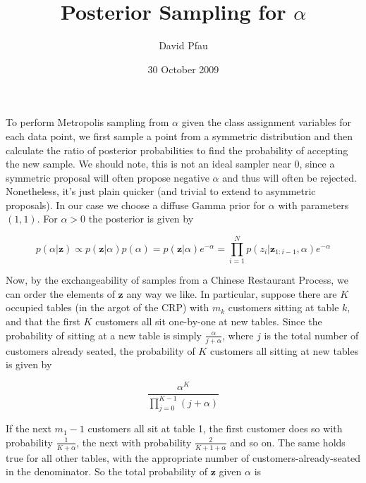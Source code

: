 \documentclass[11pt]{article}
\title{Posterior Sampling for $\alpha$}
\author{David Pfau}
\date{30 October 2009}                                           %
\begin{document}
\maketitle

To perform Metropolis sampling from $\alpha$ given the class assignment variables for each data point, we first sample a point from a symmetric distribution and then calculate the ratio of posterior probabilities to find the probability of accepting the new sample.  We should note, this is not an ideal sampler near $0$, since a symmetric proposal will often propose negative $\alpha$ and thus will often be rejected.  Nonetheless, it's just plain quicker (and trivial to extend to asymmetric proposals).  In our case we choose a diffuse Gamma prior for $\alpha$ with parameters $(1,1)$.  For $\alpha > 0$ the posterior is given by

\begin{equation}
p(\alpha|\textbf{z}) \propto p(\textbf{z}|\alpha) p(\alpha) = p(\textbf{z}|\alpha) e^{-\alpha} = \prod_{i = 1}^{N} p(z_{i}|\textbf{z}_{1:i-1},\alpha) e^{-\alpha}
\end{equation}

Now, by the exchangeability of samples from a Chinese Restaurant Process, we can order the elements of $\textbf{z}$ any way we like.  In particular, suppose there are $K$ occupied tables (in the argot of the CRP) with $m_k$ customers sitting at table $k$, and that the first $K$ customers all sit one-by-one at new tables.  Since the probability of sitting at a new table is simply $\frac{\alpha}{j+\alpha}$, where $j$ is the total number of customers already seated, the probability of $K$ customers all sitting at new tables is given by

\begin{equation}
\frac{\alpha^K}{\prod_{j=0}^{K-1} (j + \alpha)}
\end{equation}

If the next $m_1 - 1$ customers all sit at table 1, the first customer does so with probability $\frac{1}{K+\alpha}$, the next with probability $\frac{2}{K+1+\alpha}$ and so on.  The same holds true for all other tables, with the appropriate number of customers-already-seated in the denominator.  So the total probability of $\textbf{z}$ given $\alpha$ is
\end{document}

